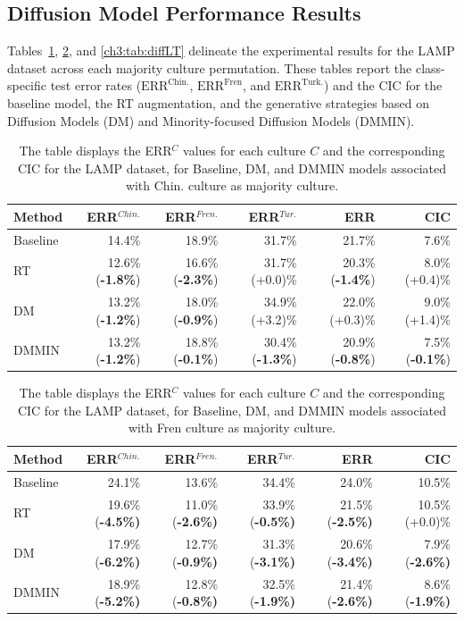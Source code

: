\subsection{Diffusion Model Performance Results}\label{ch3:sec:diff}Tables~\ref{ch3:tab:diffLC}, \ref{ch3:tab:diffLF}, and \ref{ch3:tab:diffLT} delineate the experimental results for the LAMP dataset across each majority culture permutation. These tables report the class-specific test error rates ($\text{ERR}^{\text{Chin.}}$, $\text{ERR}^{\text{Fren}}$, and $\text{ERR}^{\text{Turk.}}$) and the CIC for the baseline model, the RT augmentation, and the generative strategies based on Diffusion Models (DM) and Minority-focused Diffusion Models (DMMIN).
%
\begin{table} [H]
\centering
\begin{tabular}{lrrrrr}
\toprule
\textbf{Method} & \textbf{ERR$^{Chin.}$} & \textbf{ERR$^{Fren.}$} & \textbf{ERR$^{Tur.}$} & \textbf{ERR} & \textbf{CIC} \\
\midrule
Baseline     & 14.4\% & 18.9\% & 31.7\% & 21.7\% & 7.6\% \\
RT           & 12.6\% (\textbf{-1.8\%}) & 16.6\% (\textbf{-2.3\%}) & 31.7\% (+0.0)\% & 20.3\% (\textbf{-1.4\%}) & 8.0\% (+0.4)\% \\
DM           & 13.2\% (\textbf{-1.2\%}) & 18.0\% (\textbf{-0.9\%}) & 34.9\% (+3.2)\% & 22.0\% (+0.3)\% & 9.0\% (+1.4)\% \\
DMMIN        & 13.2\% (\textbf{-1.2\%}) & 18.8\% (\textbf{-0.1\%}) & 30.4\% (\textbf{-1.3\%}) & 20.9\% (\textbf{-0.8\%}) & 7.5\% (\textbf{-0.1\%}) \\
\bottomrule
\end{tabular}
\caption{The table displays the ERR$^C$ values for each culture $C$ and the corresponding CIC for the LAMP dataset, for Baseline, DM, and DMMIN models associated with Chin. culture as majority culture.}
\label{ch3:tab:diffLC}
\end{table}
%
%
\begin{table} [H]
\centering
\begin{tabular}{lrrrrr}
\toprule
\textbf{Method} & \textbf{ERR$^{Chin.}$} & \textbf{ERR$^{Fren.}$} & \textbf{ERR$^{Tur.}$} & \textbf{ERR} & \textbf{CIC} \\
\midrule
Baseline     & 24.1\% & 13.6\% & 34.4\% & 24.0\% & 10.5\% \\
RT           & 19.6\% (\textbf{-4.5\%)} & 11.0\% (\textbf{-2.6\%)} & 33.9\% (\textbf{-0.5\%)} & 21.5\% (\textbf{-2.5\%)} & 10.5\% (+0.0)\% \\
DM           & 17.9\% (\textbf{-6.2\%)} & 12.7\% (\textbf{-0.9\%)} & 31.3\% (\textbf{-3.1\%)} & 20.6\% (\textbf{-3.4\%)} & 7.9\% (\textbf{-2.6\%)} \\
DMMIN        & 18.9\% (\textbf{-5.2\%)} & 12.8\% (\textbf{-0.8\%)} & 32.5\% (\textbf{-1.9\%)} & 21.4\% (\textbf{-2.6\%)} & 8.6\% (\textbf{-1.9\%)} \\
\bottomrule
\end{tabular}
\caption{The table displays the ERR$^C$ values for each culture $C$ and the corresponding CIC for the LAMP dataset, for Baseline, DM, and DMMIN models associated with Fren culture as majority culture.}
\label{ch3:tab:diffLF}
\end{table}
